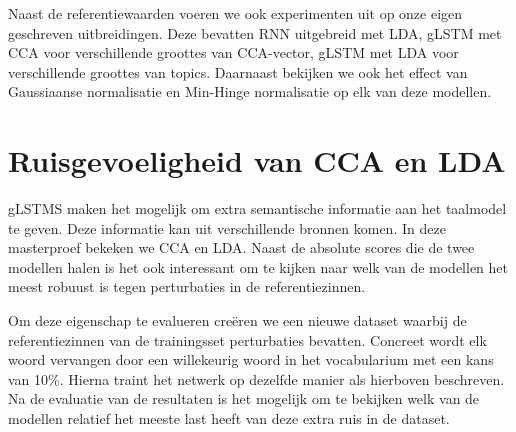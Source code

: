 Naast de referentiewaarden voeren we ook experimenten uit op onze eigen geschreven uitbreidingen.
Deze bevatten RNN uitgebreid met LDA, gLSTM met CCA voor verschillende groottes van CCA-vector, gLSTM met LDA voor verschillende groottes van topics. Daarnaast bekijken we ook het effect van Gaussiaanse normalisatie en Min-Hinge normalisatie op elk van deze modellen.

\section{Ruisgevoeligheid van CCA en LDA} %
\label{sec:ruisgevoeligheid_van_cca_en_lda}
gLSTMS maken het mogelijk om extra semantische informatie aan het taalmodel te geven. Deze informatie kan uit verschillende bronnen komen. In deze masterproef bekeken we CCA en LDA. Naast de absolute scores die de twee modellen halen is het ook interessant om te kijken naar welk van de modellen het meest robuust is tegen perturbaties in de referentiezinnen.

Om deze eigenschap te evalueren cre\"eren we een nieuwe dataset waarbij de referentiezinnen van de trainingsset perturbaties bevatten.
Concreet wordt elk woord vervangen door een willekeurig woord in het vocabularium met een kans van 10\%. Hierna traint het netwerk op dezelfde manier als hierboven beschreven. Na de evaluatie van de resultaten is het mogelijk om te bekijken welk van de modellen relatief het meeste last heeft van deze extra ruis in de dataset.


